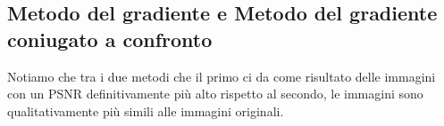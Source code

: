 \subsection{Metodo del gradiente e Metodo del gradiente coniugato a confronto}

Notiamo che tra i due metodi che il primo ci da come risultato delle immagini con un PSNR 
definitivamente più alto rispetto al secondo, le immagini sono qualitativamente più simili 
alle immagini originali. 

